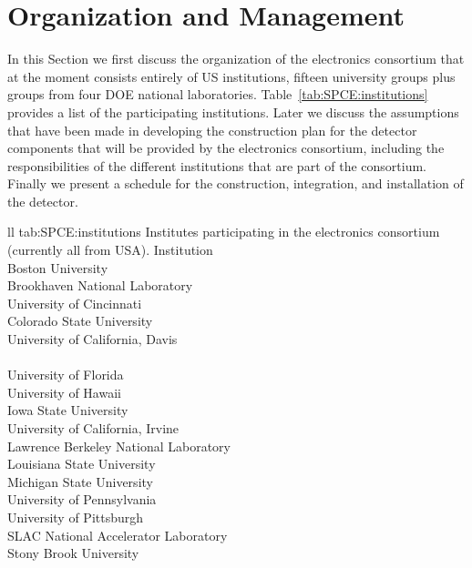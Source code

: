 \section{Organization and Management}
\label{sec:fdsp-tpcelec-management}

In this Section we first discuss the organization of the  electronics
consortium that at the moment consists entirely of US institutions, 
fifteen university groups plus groups from four DOE national 
laboratories. Table~\ref{tab:SPCE:institutions} provides a list 
of the participating institutions.
Later we discuss the assumptions that have been made in developing
the construction plan for the detector components that will be
provided by the  electronics consortium, including the responsibilities
of the different institutions that are part of the consortium. Finally
we present a schedule for the construction, integration, and installation
of the detector. 

\begin{dunetable}
{ll}
{tab:SPCE:institutions}
{Institutes participating in the  electronics consortium (currently all from USA).}
Institution  \\ \toprowrule
Boston University \\ \colhline
Brookhaven National Laboratory \\ \colhline
University of Cincinnati \\ \colhline
Colorado State University  \\ \colhline
University of California, Davis \\ \colhline
{} \\ \colhline
University of Florida \\ \colhline
University of Hawaii \\ \colhline
Iowa State University \\ \colhline
University of California, Irvine \\ \colhline
Lawrence Berkeley National Laboratory \\ \colhline
Louisiana State University \\ \colhline
Michigan State University \\ \colhline
University of Pennsylvania \\ \colhline
University of Pittsburgh \\ \colhline
SLAC National Accelerator Laboratory \\ \colhline
Stony Brook University \\
\end{dunetable}

